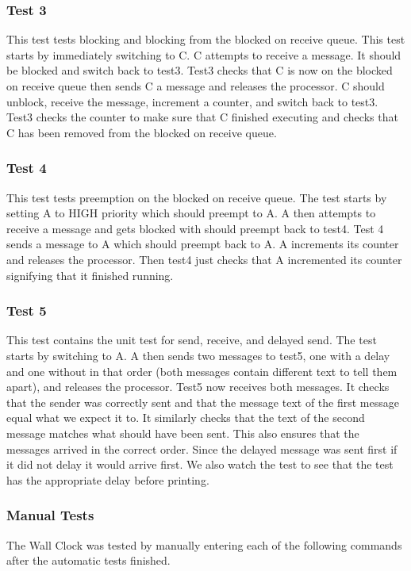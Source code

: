\documentclass[11pt, oneside]{article}
\begin{document}
\subsubsection{Test 3}
This test tests blocking and blocking from the blocked on receive queue. This test starts by immediately switching to C. C attempts to receive a message. It should be blocked and switch back to test3. Test3 checks that C is now on the blocked on receive queue then sends C a message and releases the processor. C should unblock, receive the message, increment a counter, and switch back to test3. Test3 checks the counter to make sure that C finished executing and checks that C has been removed from the blocked on receive queue.
\subsubsection{Test 4}
This test tests preemption on the blocked on receive queue. The test starts by setting A to HIGH priority which should preempt to A. A then attempts to receive a message and gets blocked with should preempt back to test4. Test 4 sends a message to A which should preempt back to A. A increments its counter and releases the processor. Then test4 just checks that A incremented its counter signifying that it finished running.
\subsubsection{Test 5}
This test contains the unit test for send, receive, and delayed send. The test starts by switching to A. A then sends two messages to test5, one with a delay and one without in that order (both messages contain different text to tell them apart), and releases the processor. Test5 now receives both messages. It checks that the sender was correctly sent and that the message text of the first message equal what we expect it to. It similarly checks that the text of the second message matches what should have been sent. This also ensures that the messages arrived in the correct order. Since the delayed message was sent first if it did not delay it would arrive first. We also watch the test to see that the test has the appropriate delay before printing.
\subsubsection{Manual Tests}
The Wall Clock was tested by manually entering each of the following commands after the automatic tests finished.
\end{document}
